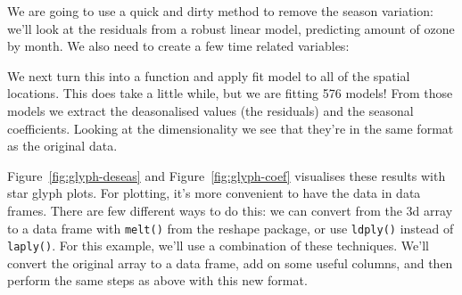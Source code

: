 \documentclass{scrartcl}
\newcommand{\f}[1]{\lstinline!#1()!}
\begin{document}
% 


We are going to use a quick and dirty method to remove the season variation: we'll look at the residuals from a robust linear model, predicting amount of ozone by month.  We also need to create a few time related variables:

% 
%


%


We next turn this into a function and apply fit model to all of the spatial locations.  This does take a little while, but we are fitting 576 models!  From those models we extract the deasonalised values (the residuals) and the seasonal coefficients.  Looking at the dimensionality we see that they're in the same format as the original data.

% 
% 
% 
% 

Figure~\ref{fig:glyph-deseas} and Figure~\ref{fig:glyph-coef} visualises these results with star glyph plots.  For plotting, it's more convenient to have the data in data frames.  There are few different ways to do this: we can convert from the 3d array to a data frame with \f{melt} from the reshape package, or use \f{ldply} instead of \f{laply}.  For this example, we'll use a combination of these techniques.  We'll convert the original array to a data frame, add on some useful columns, and then perform the same steps as above with this new format.

% 
\end{document}
